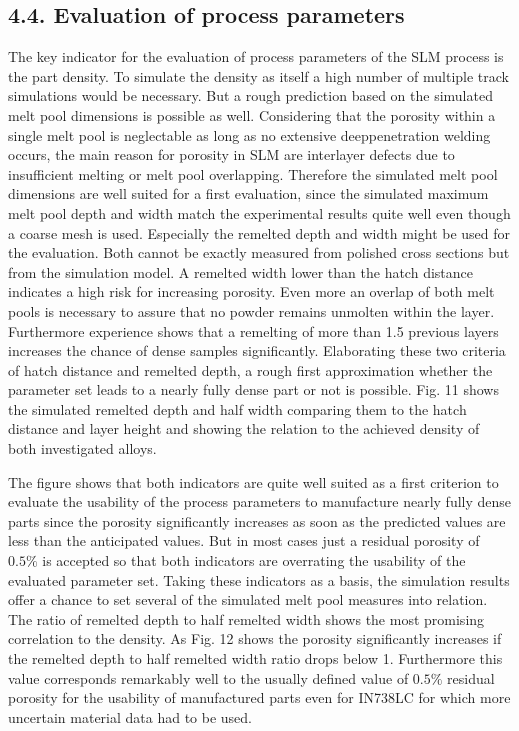 \documentclass[10pt]{article}
\begin{document}
\subsection*{4.4. Evaluation of process parameters}
The key indicator for the evaluation of process parameters of the SLM process is the part density. To simulate the density as itself a high number of multiple track simulations would be necessary. But a rough prediction based on the simulated melt pool dimensions is possible as well. Considering that the porosity within a single melt pool is neglectable as long as no extensive deeppenetration welding occurs, the main reason for porosity in SLM are interlayer defects due to insufficient melting or melt pool overlapping. Therefore the simulated melt pool dimensions are well suited for a first evaluation, since the simulated maximum melt pool depth and width match the experimental results quite well even though a coarse mesh is used. Especially the remelted depth and width might be used for the evaluation. Both cannot be exactly measured from polished cross sections but from the simulation model. A remelted width lower than the hatch distance indicates a high risk for increasing porosity. Even more an overlap of both melt pools is necessary to assure that no powder remains unmolten within the layer. Furthermore experience shows that a remelting of more than 1.5 previous layers increases the chance of dense samples significantly. Elaborating these two criteria of hatch distance and remelted depth, a rough first approximation whether the parameter set leads to a nearly fully dense part or not is possible. Fig. 11 shows the simulated remelted depth and half width comparing them to the hatch distance and layer height and showing the relation to the achieved density of both investigated alloys.

The figure shows that both indicators are quite well suited as a first criterion to evaluate the usability of the process parameters to manufacture nearly fully dense parts since the porosity significantly increases as soon as the predicted values are less than the anticipated values. But in most cases just a residual porosity of $0.5 \%$ is accepted so that both indicators are overrating the usability of the evaluated parameter set. Taking these indicators as a basis, the simulation results offer a chance to set several of the simulated melt pool measures into relation. The ratio of remelted depth to half remelted width shows the most promising correlation to the density. As Fig. 12 shows the porosity significantly increases if the remelted depth to half remelted width ratio drops below 1. Furthermore this value corresponds remarkably well to the usually defined value of $0.5 \%$ residual porosity for the usability of manufactured parts even for IN738LC for which more uncertain material data had to be used.
\end{document}
